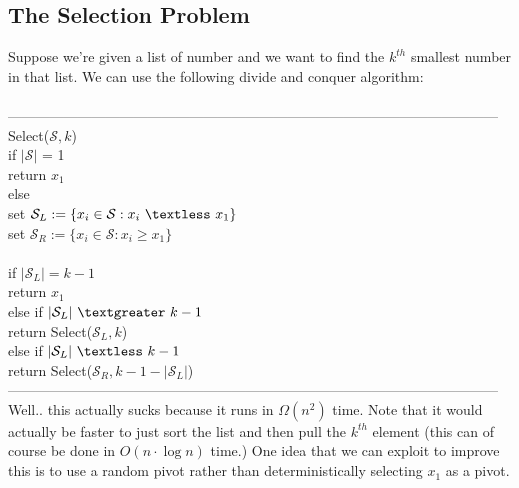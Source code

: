 \documentclass{article}
\newcommand{\lt}{\textless}
\newcommand{\gt}{\textgreater}
\newcommand{\x}{\cdot}
\begin{document}
\subsection{The Selection Problem}
Suppose we're given a list of number and we want to find the $k^{th}$ smallest number in that list. We can use the following divide and conquer algorithm:\\\\
---------------------------------------------------------------------------------------------------------
Select($\mathcal{S}, k$)\\
	\hspace*{7mm} if $|\mathcal{S}|$ = 1\\
	\hspace*{14mm} return $x_1$\\
	\hspace*{7mm} else\\
	\hspace*{14mm} set $\mathcal{S}_L := \{x_i \in \mathcal{S} : x_i\ \lt\ x_1\}$\\
	\hspace*{14mm} set $\mathcal{S}_R := \{x_i \in \mathcal{S} : x_i \geq x_1\}$\\\\
	\hspace*{14mm} if $|\mathcal{S}_L| = k-1$\\
	\hspace*{21mm} return $x_1$\\
	\hspace*{14mm} else if $|\mathcal{S}_L|\ \gt\ k-1$\\
	\hspace*{21mm} return Select($\mathcal{S}_L , k$)\\
	\hspace*{14mm} else if $|\mathcal{S}_L|\ \lt\  k-1$\\
	\hspace*{21mm} return Select($\mathcal{S}_R , k-1-|\mathcal{S}_L|$)\\
---------------------------------------------------------------------------------------------------------\\
Well.. this actually sucks because it runs in $\Omega(n^2)$ time. Note that it would actually be faster to just sort the list and then pull the $k^{th}$ element (this can of course be done in $O(n\x \log n)$ time.) One idea that we can exploit to improve this is to use a random pivot rather than deterministically selecting $x_1$ as a pivot.\\\\
\end{document}
